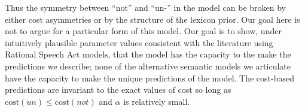 \documentclass[floatsintext,doc]{apa6}
\let\rmarkdownfootnote\footnote%
\def\footnote{\protect\rmarkdownfootnote}
\begin{document}

Thus the symmetry between ``not'' and ``un-'' in the \ourmodel model can be broken by either cost asymmetries or by the structure of the lexicon prior.
Our goal here is not to argue for a particular form of this model.
Our goal is to show, under intuitively plausible parameter values consistent with the literature using Rational Speech Act models, that the \ourmodel model has the capacity to the make the predictions we describe; none of the alternative semantic models we articulate have the capacity to make the unique predictions of the \ourmodel model.
The cost-based predictions are invariant to the exact values of cost so long as $\text{cost}(un) \leq \text{cost}(not)$ and $\alpha$ is relatively small. 





\end{document}
